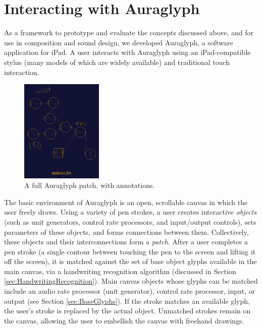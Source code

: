 \documentclass{nime-alternate}
\begin{document}
\section{Interacting with Auraglyph}
\label{sec:SystemDescription}

As a framework to prototype and evaluate the concepts discussed above, and for use in composition and sound design, we developed Auraglyph, a software application for iPad. 
A user interacts with Auraglyph using an iPad-compatible stylus (many models of which are widely available) and traditional touch interaction. 

\begin{figure}[h]
	\centering
		\includegraphics[width=0.35\textwidth]{figures/patch.png}
	\caption{A full Auraglyph patch, with annotations.}
	\label{fig:patch}
\end{figure}

The basic environment of Auraglyph is an open, scrollable canvas in which the user freely draws. 
Using a variety of pen strokes, a user creates interactive \emph{objects} (such as unit generators, control rate processors, and input/output controls), sets parameters of these objects, and forms connections between them. 
Collectively, these objects and their interconnections form a \emph{patch}. 
After a user completes a pen stroke (a single contour between touching the pen to the screen and lifting it off the screen), it is matched against the set of base object glyphs available in the main canvas, via a handwriting recognition algorithm (discussed in Section \ref{sec:HandwritingRecognition}). 
Main canvas objects whose glyphs can be matched include an audio rate processor (unit generator), control rate processor, input, or output (see Section \ref{sec:BaseGlyphs}). 
If the stroke matches an available glyph, the user's stroke is replaced by the actual object. 
Unmatched strokes remain on the canvas, allowing the user to embellish the canvas with freehand drawings. 
\end{document}
